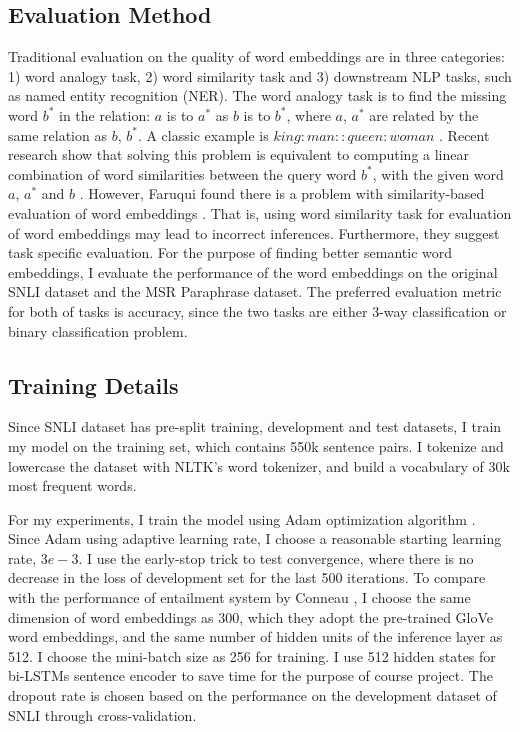 \documentclass[10pt,twocolumn,letterpaper]{article}
\begin{document}
\subsection{Evaluation Method}
Traditional evaluation on the quality of word embeddings are in three categories: 1) word analogy task, 2) word similarity task and 3) downstream NLP tasks, such as named entity recognition (NER). The word analogy task is to find the missing word $b^*$ in the relation: $a$ is to $a^*$ as $b$ is to $b^*$, where $a$, $a^*$ are related by the same relation as $b$, $b^*$. A classic example is $king : man :: queen : woman$ \cite{mikolov2013distributed}. Recent research show that solving this problem is equivalent to computing a linear combination of word similarities between the query word $b^*$, with the given word $a$, $a^*$ and $b$ \cite{levy2014linguistic}. However, Faruqui \etal found there is a problem with similarity-based evaluation of word embeddings \cite{faruqui2016problems}. That is, using word similarity task for evaluation of word embeddings may lead to incorrect inferences. Furthermore, they suggest task specific evaluation. For the purpose of finding better semantic word embeddings, I evaluate  the performance of the word embeddings on the original SNLI dataset and the MSR Paraphrase dataset. The preferred evaluation metric for both of tasks is accuracy, since the two tasks are either 3-way classification or binary classification problem.

\subsection{Training Details}
Since SNLI dataset has pre-split training, development and test datasets, I train my model on the training set, which contains 550k sentence pairs. I tokenize and lowercase the dataset with NLTK's word tokenizer, and build a vocabulary of 30k most frequent words.

For my experiments, I train the model using Adam optimization algorithm \cite{kingma2014adam}. Since Adam using adaptive learning rate, I choose a reasonable starting learning rate, $3e-3$. I use the early-stop trick to test convergence, where there is no decrease in the loss of development set for the last 500 iterations. To compare with the performance of entailment system by Conneau \etal \cite{conneau2017supervised}, I choose the same dimension of word embeddings as 300, which they adopt the pre-trained GloVe word embeddings, and the same number of hidden units of the inference layer as 512. I choose the mini-batch size as 256 for training. I use 512 hidden states for bi-LSTMs sentence encoder to save time for the purpose of course project. The dropout rate is chosen based on the performance on the development dataset of SNLI through cross-validation.
\end{document}
